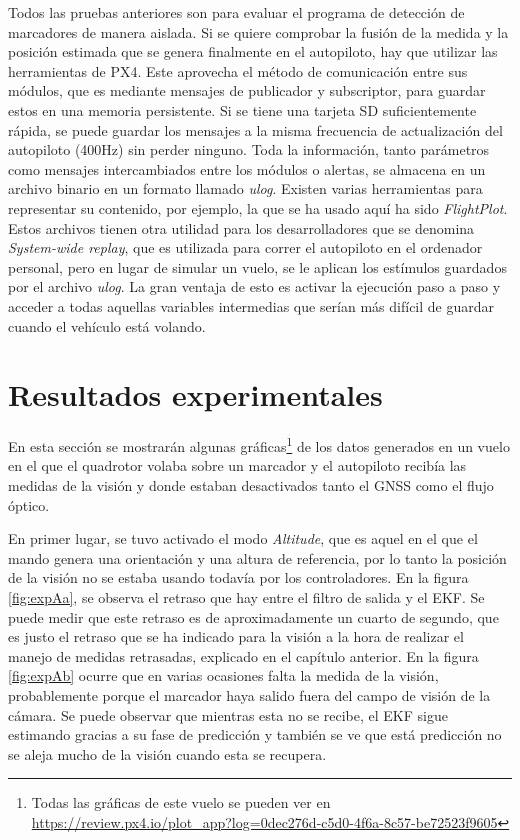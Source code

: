 Todos las pruebas anteriores son para evaluar el programa de detección de marcadores de manera aislada. Si se quiere comprobar la fusión de la medida y la posición estimada que se genera finalmente en el autopiloto, hay que utilizar las herramientas de PX4. Este aprovecha el método de comunicación entre sus módulos, que es mediante mensajes de publicador y subscriptor, para guardar estos en una memoria persistente. Si se tiene una tarjeta SD suficientemente rápida, se puede guardar los mensajes a la misma frecuencia de actualización del autopiloto (400Hz) sin perder ninguno. 
Toda la información, tanto parámetros como mensajes intercambiados entre los módulos o alertas, se almacena en un archivo binario en un formato llamado \textit{ulog}. Existen varias herramientas para representar su contenido, por ejemplo, la que se ha usado aquí ha sido \textit{FlightPlot}. Estos archivos tienen otra utilidad para los desarrolladores que se denomina \textit{System-wide replay}, que es utilizada para correr el autopiloto en el ordenador personal, pero en lugar de simular un vuelo, se le aplican los estímulos guardados por el archivo \textit{ulog}. La gran ventaja de esto es activar la ejecución paso a paso y acceder a todas aquellas variables intermedias que serían más difícil de guardar cuando el vehículo está volando.


\section{Resultados experimentales}
En esta sección se mostrarán algunas gráficas\footnote{Todas las gráficas de este vuelo se pueden ver en \url{https://review.px4.io/plot\_app?log=0dec276d-c5d0-4f6a-8c57-be72523f9605}} de los datos generados en un vuelo en el que el quadrotor volaba sobre un marcador y el autopiloto recibía las medidas de la visión y donde estaban desactivados tanto el GNSS como el flujo óptico. 

En primer lugar, se tuvo activado el modo \textit{Altitude}, que es aquel en el que el mando genera una orientación y una altura de referencia, por lo tanto la posición de la visión no se estaba usando todavía por los controladores. En la figura \ref{fig:expAa}, se observa el retraso que hay entre el filtro de salida y el EKF. Se puede medir que este retraso es de aproximadamente un cuarto de segundo, que es justo el retraso que se ha indicado para la visión a la hora de realizar el manejo de medidas retrasadas, explicado en el capítulo anterior. En la figura \ref{fig:expAb} ocurre que en varias ocasiones falta la medida de la visión, probablemente porque el marcador haya salido fuera del campo de visión de la cámara. Se puede observar que mientras esta no se recibe, el EKF sigue estimando gracias a su fase de predicción y también se ve que está predicción no se aleja mucho de la visión cuando esta se recupera.

